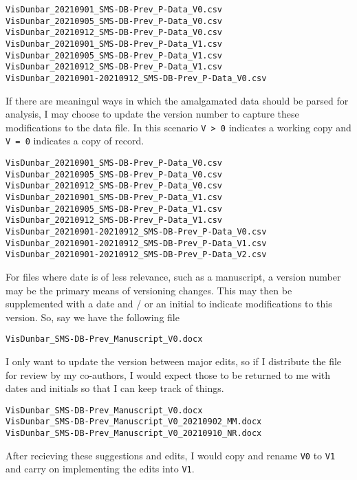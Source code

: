 \documentclass[
]{book}
\begin{document}
\begin{verbatim}
VisDunbar_20210901_SMS-DB-Prev_P-Data_V0.csv
VisDunbar_20210905_SMS-DB-Prev_P-Data_V0.csv
VisDunbar_20210912_SMS-DB-Prev_P-Data_V0.csv
VisDunbar_20210901_SMS-DB-Prev_P-Data_V1.csv
VisDunbar_20210905_SMS-DB-Prev_P-Data_V1.csv
VisDunbar_20210912_SMS-DB-Prev_P-Data_V1.csv
VisDunbar_20210901-20210912_SMS-DB-Prev_P-Data_V0.csv
\end{verbatim}

If there are meaningul ways in which the amalgamated data should be parsed for analysis, I may choose to update the version number to capture these modifications to the data file. In this scenario \texttt{V\ \textgreater{}\ 0} indicates a working copy and \texttt{V\ =\ 0} indicates a copy of record.

\begin{verbatim}
VisDunbar_20210901_SMS-DB-Prev_P-Data_V0.csv
VisDunbar_20210905_SMS-DB-Prev_P-Data_V0.csv
VisDunbar_20210912_SMS-DB-Prev_P-Data_V0.csv
VisDunbar_20210901_SMS-DB-Prev_P-Data_V1.csv
VisDunbar_20210905_SMS-DB-Prev_P-Data_V1.csv
VisDunbar_20210912_SMS-DB-Prev_P-Data_V1.csv
VisDunbar_20210901-20210912_SMS-DB-Prev_P-Data_V0.csv
VisDunbar_20210901-20210912_SMS-DB-Prev_P-Data_V1.csv
VisDunbar_20210901-20210912_SMS-DB-Prev_P-Data_V2.csv
\end{verbatim}

For files where date is of less relevance, such as a manuscript, a version number may be the primary means of versioning changes. This may then be supplemented with a date and / or an initial to indicate modifications to this version. So, say we have the following file

\begin{verbatim}
VisDunbar_SMS-DB-Prev_Manuscript_V0.docx
\end{verbatim}

I only want to update the version between major edits, so if I distribute the file for review by my co-authors, I would expect those to be returned to me with dates and initials so that I can keep track of things.

\begin{verbatim}
VisDunbar_SMS-DB-Prev_Manuscript_V0.docx
VisDunbar_SMS-DB-Prev_Manuscript_V0_20210902_MM.docx
VisDunbar_SMS-DB-Prev_Manuscript_V0_20210910_NR.docx
\end{verbatim}

After recieving these suggestions and edits, I would copy and rename \texttt{V0} to \texttt{V1} and carry on implementing the edits into \texttt{V1}.
\end{document}

